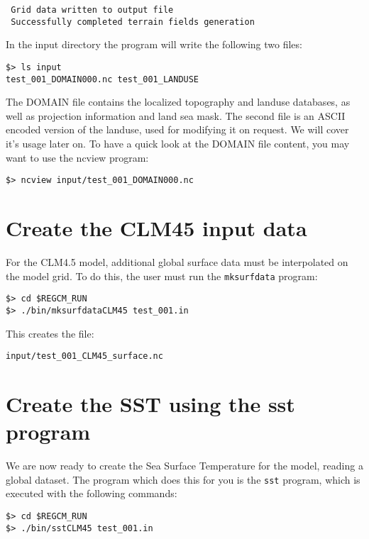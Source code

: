 \begin{Verbatim}
 Grid data written to output file                                               
 Successfully completed terrain fields generation
\end{Verbatim}

In the input directory the program will write the following two files:

\begin{Verbatim}
$> ls input
test_001_DOMAIN000.nc test_001_LANDUSE
\end{Verbatim}

The DOMAIN file contains the localized topography and landuse databases, as
well as projection information and land sea mask. The second file is an ASCII
encoded version of the landuse, used for modifying it on request. We will cover
it's usage later on.  To have a quick look at the DOMAIN file content, you may
want to use the ncview program:

\begin{Verbatim}
$> ncview input/test_001_DOMAIN000.nc
\end{Verbatim}

\section{Create the CLM45 input data}

For the CLM4.5 model, additional global surface data must be interpolated on
the model grid. To do this, the user must run the \verb=mksurfdata= program:

\begin{Verbatim}
$> cd $REGCM_RUN
$> ./bin/mksurfdataCLM45 test_001.in
\end{Verbatim}

This creates the file:

\begin{Verbatim}
input/test_001_CLM45_surface.nc
\end{Verbatim}

\section{Create the SST using the sst program}

We are now ready to create the Sea Surface Temperature for the model, reading
a global dataset.
The program which does this for you is the \verb=sst= program, which is
executed with the following commands:

\begin{Verbatim}
$> cd $REGCM_RUN
$> ./bin/sstCLM45 test_001.in
\end{Verbatim}

